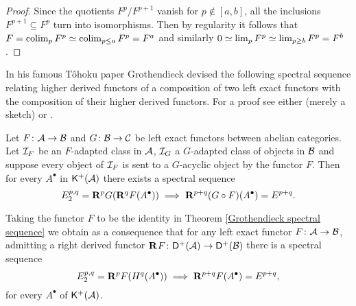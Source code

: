 \begin{proof}
    Since the quotients $F^p/F^{p+1}$ vanish for $p \notin [a,b]$, all the inclusions $F^{p+1} \subseteq F^p$ turn into isomorphisms. Then by regularity it follows that $F = \operatorname{colim}_p F^p \simeq \operatorname{colim}_{p \leq a} F^p = F^{a}$ and similarly $0 \simeq \lim_p F^p \simeq \lim_{p \geq b} F^p =  F^b$.
\end{proof}


In his famous Tôhoku paper \cite{grothendieck57} Grothendieck devised the following spectral sequence relating higher derived functors of a composition of two left exact functors with the composition of their higher derived functors. For a proof see either \cite[\S 2, Proposition 2.66]{huybrechts2006fouriermukai} (merely a sketch) or \cite[\S 2.4]{grothendieck57}.

\begin{theorem}
    \label{Grothendieck spectral sequence}
    Let $F\colon \mathcal A \to \mathcal B$ and $G\colon \mathcal B \to \mathcal C$ be left exact functors between abelian categories. Let $\mathcal I_F$ be an $F$-adapted class in $\mathcal A$, $\mathcal I_G$ a $G$-adapted class of objects in $\mathcal B$ and suppose every object of $\mathcal I_F$ is sent to a $G$-acyclic object by the functor $F$. Then for every $A^\bullet$ in $\mathsf{K}^+(\mathcal A)$ there exists a spectral sequence
    \begin{equation}
        \label{eq: Grothendieck spectral sequence}
        E^{p,q}_2 = \mathbf{R}^{p}G(\mathbf{R}^{q}F(A^\bullet)) \implies \mathbf{R}^{p+q}(G \circ F)(A^\bullet) = E^{p+q}.
    \end{equation} 
\end{theorem}

\begin{remark}
    Taking the functor $F$ to be the identity in Theorem \ref{Grothendieck spectral sequence} we obtain as a consequence that for any left exact functor $F \colon \mathcal A \to \mathcal B$, admitting a right derived functor $\mathbf{R}^{}F\colon \mathsf{D}^+(\mathcal A) \to \mathsf{D}^+(\mathcal B)$ there is a spectral sequence 
    \begin{equation}
        \label{eq: special case of Grothendieck spectral sequence}
        E^{p,q}_2 = \mathbf{R}^{p}F(H^q(A^\bullet)) \implies \mathbf{R}^{p+q}F(A^\bullet) = E^{p+q},
    \end{equation}
    for every $A^\bullet$ of $\mathsf{K}^+(\mathcal A)$.
\end{remark}

